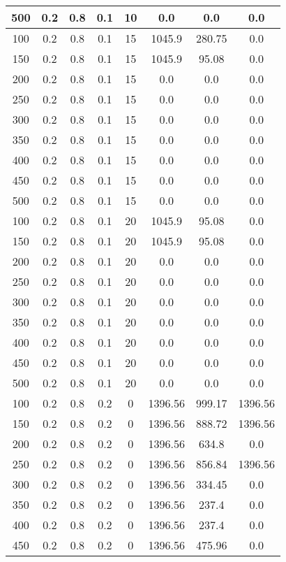 \documentclass[a4paper, 12pt]{extreport}
\begin{document}
\begin{itemize}
\begin{longtable}{|c|c|c|c|c|c|c|c|}
			500 & 0.2 & 0.8 & 0.1 & 10 & 0.0 & 0.0 & 0.0 \\\hline
			100 & 0.2 & 0.8 & 0.1 & 15 & 1045.9 & 280.75 & 0.0 \\\hline
			150 & 0.2 & 0.8 & 0.1 & 15 & 1045.9 & 95.08 & 0.0 \\\hline
			200 & 0.2 & 0.8 & 0.1 & 15 & 0.0 & 0.0 & 0.0 \\\hline
			250 & 0.2 & 0.8 & 0.1 & 15 & 0.0 & 0.0 & 0.0 \\\hline
			300 & 0.2 & 0.8 & 0.1 & 15 & 0.0 & 0.0 & 0.0 \\\hline
			350 & 0.2 & 0.8 & 0.1 & 15 & 0.0 & 0.0 & 0.0 \\\hline
			400 & 0.2 & 0.8 & 0.1 & 15 & 0.0 & 0.0 & 0.0 \\\hline
			450 & 0.2 & 0.8 & 0.1 & 15 & 0.0 & 0.0 & 0.0 \\\hline
			500 & 0.2 & 0.8 & 0.1 & 15 & 0.0 & 0.0 & 0.0 \\\hline
			100 & 0.2 & 0.8 & 0.1 & 20 & 1045.9 & 95.08 & 0.0 \\\hline
			150 & 0.2 & 0.8 & 0.1 & 20 & 1045.9 & 95.08 & 0.0 \\\hline
			200 & 0.2 & 0.8 & 0.1 & 20 & 0.0 & 0.0 & 0.0 \\\hline
			250 & 0.2 & 0.8 & 0.1 & 20 & 0.0 & 0.0 & 0.0 \\\hline
			300 & 0.2 & 0.8 & 0.1 & 20 & 0.0 & 0.0 & 0.0 \\\hline
			350 & 0.2 & 0.8 & 0.1 & 20 & 0.0 & 0.0 & 0.0 \\\hline
			400 & 0.2 & 0.8 & 0.1 & 20 & 0.0 & 0.0 & 0.0 \\\hline
			450 & 0.2 & 0.8 & 0.1 & 20 & 0.0 & 0.0 & 0.0 \\\hline
			500 & 0.2 & 0.8 & 0.1 & 20 & 0.0 & 0.0 & 0.0 \\\hline
			100 & 0.2 & 0.8 & 0.2 & 0 & 1396.56 & 999.17 & 1396.56 \\\hline
			150 & 0.2 & 0.8 & 0.2 & 0 & 1396.56 & 888.72 & 1396.56 \\\hline
			200 & 0.2 & 0.8 & 0.2 & 0 & 1396.56 & 634.8 & 0.0 \\\hline
			250 & 0.2 & 0.8 & 0.2 & 0 & 1396.56 & 856.84 & 1396.56 \\\hline
			300 & 0.2 & 0.8 & 0.2 & 0 & 1396.56 & 334.45 & 0.0 \\\hline
			350 & 0.2 & 0.8 & 0.2 & 0 & 1396.56 & 237.4 & 0.0 \\\hline
			400 & 0.2 & 0.8 & 0.2 & 0 & 1396.56 & 237.4 & 0.0 \\\hline
			450 & 0.2 & 0.8 & 0.2 & 0 & 1396.56 & 475.96 & 0.0 \\\hline

\end{longtable}
\end{itemize}
\end{document}
